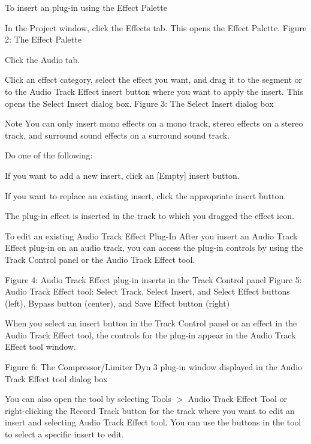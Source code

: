 To insert an plug-\/in using the Effect Palette  
\begin{DoxyEnumerate}
\item In the Project window, click the Effects tab. This opens the Effect Palette.   Figure 2\+: The Effect Palette  
\item Click the Audio tab.  
\item Click an effect category, select the effect you want, and drag it to the segment or to the Audio Track Effect insert button where you want to apply the insert. This opens the Select Insert dialog box.   Figure 3\+: The Select Insert dialog box \begin{DoxyNote}{Note}
You can only insert mono effects on a mono track, stereo effects on a stereo track, and surround sound effects on a surround sound track.  
\end{DoxyNote}

\item Do one of the following\+: 
\begin{DoxyItemize}
\item If you want to add a new insert, click an \mbox{[}Empty\mbox{]} insert button.  
\item If you want to replace an existing insert, click the appropriate insert button.  
\end{DoxyItemize}The plug-\/in effect is inserted in the track to which you dragged the effect icon.  
\end{DoxyEnumerate}

To edit an existing Audio Track Effect Plug-\/\+In  After you insert an Audio Track Effect plug-\/in on an audio track, you can access the plug-\/in controls by using the Track Control panel or the Audio Track Effect tool.

  Figure 4\+: Audio Track Effect plug-\/in inserts in the Track Control panel   Figure 5\+: Audio Track Effect tool\+: Select Track, Select Insert, and Select Effect buttons (left), Bypass button (center), and Save Effect button (right)

When you select an insert button in the Track Control panel or an effect in the Audio Track Effect tool, the controls for the plug-\/in appear in the Audio Track Effect tool window.

  Figure 6\+: The Compressor/\+Limiter Dyn 3 plug-\/in window displayed in the Audio Track Effect tool dialog box

You can also open the tool by selecting Tools $>$ Audio Track Effect Tool or right-\/clicking the Record Track button for the track where you want to edit an insert and selecting Audio Track Effect tool. You can use the buttons in the tool to select a specific insert to edit.

